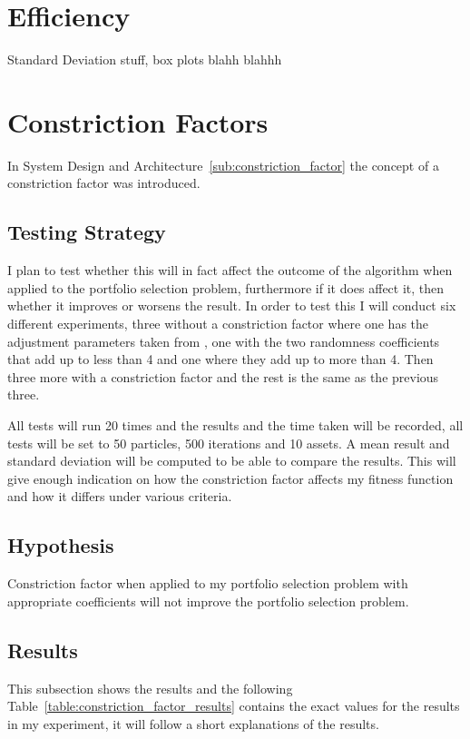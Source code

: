 \documentclass{pdfmx4020}
\begin{document}
  \section{Efficiency} %
  \label{sec:efficiency}
    Standard Deviation stuff, box plots blahh blahhh

  \section{Constriction Factors} %
  \label{sec:constriction_factors}
  In System Design and Architecture~\ref{sub:constriction_factor} the concept of a constriction factor was introduced. 
    
    \subsection{Testing Strategy} %
    \label{sub:testing_strategy}
      I plan to test whether this will in fact affect the outcome of the algorithm when applied to the portfolio selection problem, furthermore if it does affect it, then whether it improves or worsens the result. In order to test this I will conduct six different experiments, three without a constriction factor where one has the adjustment parameters taken from \cite{constriction_factor_3}, one with the two randomness coefficients that add up to less than 4 and one where they add up to more than 4. Then three more with a constriction factor and the rest is the same as the previous three.

      All tests will run 20 times and the results and the time taken will be recorded, all tests will be set to 50 particles, 500 iterations and 10 assets. A mean result and standard deviation will be computed to be able to compare the results. This will give enough indication on how the constriction factor affects my fitness function and how it differs under various criteria.  

    \subsection{Hypothesis} %
    \label{sub:hypothesis}
      Constriction factor when applied to my portfolio selection problem with appropriate coefficients will not improve the portfolio selection problem.

    \subsection{Results} %
    \label{sub:results}
      This subsection shows the results and the following Table~\ref{table:constriction_factor_results} contains the exact values for the results in my experiment, it will follow a short explanations of the results. 
\end{document}
